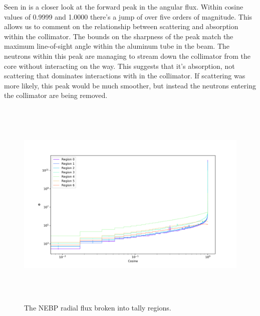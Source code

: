 Seen in  is a closer look at the forward peak in the angular flux.
Within cosine values of 0.9999 and 1.0000 there's a jump of over five orders of magnitude.
This allows us to comment on the relationship between scattering and absorption within the collimator.
The bounds on the sharpness of the peak match the maximum line-of-sight angle within the aluminum tube in the beam.
The neutrons within this peak are managing to stream down the collimator from the core without interacting on the way.
This suggests that it's absorption, not scattering that dominates interactions with in the collimator.
If scattering was more likely, this peak would be much smoother, but instead the neutrons entering the collimator are being removed.


\begin{figure}[htb]
\centering
\includegraphics[height=4in]{tex/figures/flux_rad_cos.png}
\caption[Regional Flux vs. Angle]{The NEBP radial flux broken into tally regions.}
\label{fig:flux_rad_cos}
\end{figure}


